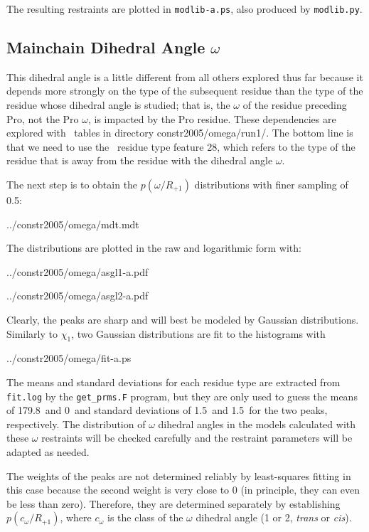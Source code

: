 The resulting restraints are plotted in
{\tt modlib-a.ps}, also produced by {\tt modlib.py}.


\subsection{Mainchain Dihedral Angle $\omega$}

This dihedral angle is a little different from all others explored thus far because it 
depends more strongly on the type of the subsequent residue than the type of the 
residue whose dihedral angle is studied; that is, the $\omega$ of the residue preceding 
Pro, not the Pro $\omega$, is impacted by the Pro residue. These dependencies are explored 
with \MDT\ tables in directory {constr2005/omega/run1/}. The bottom
line is that we need to use the \MDT\ residue type feature 28, which refers to the type
of the residue that is  away from the residue with the dihedral
angle $\omega$.

The next step is to obtain the $p(\omega/R_{+1})$ distributions with finer sampling of
0.5\degr:

           {../constr2005/omega/mdt.mdt}

The distributions are plotted in the raw and logarithmic form with:

           {../constr2005/omega/asgl1-a.pdf}

           {../constr2005/omega/asgl2-a.pdf}

Clearly, the peaks are sharp and will best be modeled by Gaussian distributions.  
Similarly to $\chi_1$, two Gaussian distributions are fit to the histograms with

           {../constr2005/omega/fit-a.ps}

The means and standard deviations for each residue type are extracted from {\tt fit.log} by 
the {\tt get\_prms.F} program, but they are only used to guess the means of 179.8\degr\ and 0\degr\ 
and standard deviations of 1.5\degr\ and 1.5\degr\ for the two peaks, respectively. The
distribution of $\omega$ dihedral angles in the models calculated with these $\omega$ restraints 
will be checked carefully and the restraint parameters will be adapted as needed.

The weights of the peaks are not determined reliably by least-squares fitting in this case
because the second weight is very close to 0 (in principle, they can even be less than zero). 
Therefore, they are determined separately
by establishing $p(c_{\omega}/R_{+1})$, where $c_{\omega}$ is the class of the $\omega$
dihedral angle (1 or 2, {\em trans} or {\em cis}).

